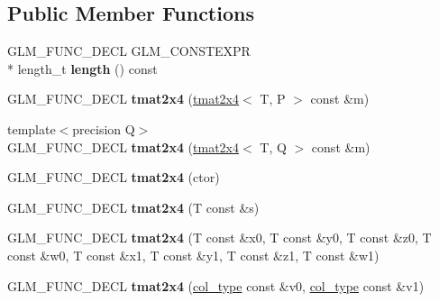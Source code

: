 \subsection*{Public Member Functions}
\begin{DoxyCompactItemize}
\item 
\hypertarget{structglm_1_1detail_1_1tmat2x4_a3db525cbb29b4356a96d2d28489153fb}{G\-L\-M\-\_\-\-F\-U\-N\-C\-\_\-\-D\-E\-C\-L G\-L\-M\-\_\-\-C\-O\-N\-S\-T\-E\-X\-P\-R \\*
length\-\_\-t {\bfseries length} () const }\label{structglm_1_1detail_1_1tmat2x4_a3db525cbb29b4356a96d2d28489153fb}

\item 
\hypertarget{structglm_1_1detail_1_1tmat2x4_a2246d953fc5f0c2024b887d1a4c83a06}{G\-L\-M\-\_\-\-F\-U\-N\-C\-\_\-\-D\-E\-C\-L {\bfseries tmat2x4} (\hyperlink{structglm_1_1detail_1_1tmat2x4}{tmat2x4}$<$ T, P $>$ const \&m)}\label{structglm_1_1detail_1_1tmat2x4_a2246d953fc5f0c2024b887d1a4c83a06}

\item 
\hypertarget{structglm_1_1detail_1_1tmat2x4_a6abbbe035dd18771e08fc4e8e25aa043}{{\footnotesize template$<$precision Q$>$ }\\G\-L\-M\-\_\-\-F\-U\-N\-C\-\_\-\-D\-E\-C\-L {\bfseries tmat2x4} (\hyperlink{structglm_1_1detail_1_1tmat2x4}{tmat2x4}$<$ T, Q $>$ const \&m)}\label{structglm_1_1detail_1_1tmat2x4_a6abbbe035dd18771e08fc4e8e25aa043}

\item 
\hypertarget{structglm_1_1detail_1_1tmat2x4_ad3a92b19fec6109e97262c6e43699ee9}{G\-L\-M\-\_\-\-F\-U\-N\-C\-\_\-\-D\-E\-C\-L {\bfseries tmat2x4} (ctor)}\label{structglm_1_1detail_1_1tmat2x4_ad3a92b19fec6109e97262c6e43699ee9}

\item 
\hypertarget{structglm_1_1detail_1_1tmat2x4_a3226371920e32b8cc562b6325f19d0f5}{G\-L\-M\-\_\-\-F\-U\-N\-C\-\_\-\-D\-E\-C\-L {\bfseries tmat2x4} (T const \&s)}\label{structglm_1_1detail_1_1tmat2x4_a3226371920e32b8cc562b6325f19d0f5}

\item 
\hypertarget{structglm_1_1detail_1_1tmat2x4_abc1d0f89ff3055acdb275ef0ef3904bd}{G\-L\-M\-\_\-\-F\-U\-N\-C\-\_\-\-D\-E\-C\-L {\bfseries tmat2x4} (T const \&x0, T const \&y0, T const \&z0, T const \&w0, T const \&x1, T const \&y1, T const \&z1, T const \&w1)}\label{structglm_1_1detail_1_1tmat2x4_abc1d0f89ff3055acdb275ef0ef3904bd}

\item 
\hypertarget{structglm_1_1detail_1_1tmat2x4_ab0203c409f15c920754cb7ee35bb387c}{G\-L\-M\-\_\-\-F\-U\-N\-C\-\_\-\-D\-E\-C\-L {\bfseries tmat2x4} (\hyperlink{structglm_1_1detail_1_1tvec4}{col\-\_\-type} const \&v0, \hyperlink{structglm_1_1detail_1_1tvec4}{col\-\_\-type} const \&v1)}\label{structglm_1_1detail_1_1tmat2x4_ab0203c409f15c920754cb7ee35bb387c}


\end{DoxyCompactItemize}
